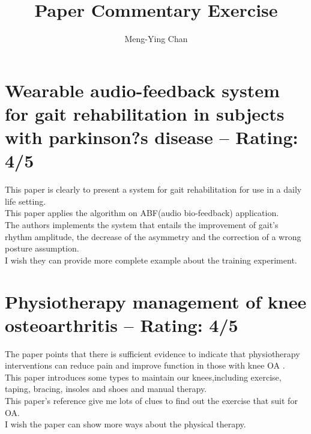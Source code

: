 \documentclass[a4paper]{article}
\title{Paper Commentary Exercise}
\author{Meng-Ying Chan}
\begin{document}
\maketitle

\section{Wearable audio-feedback system for gait rehabilitation in subjects with parkinson?s disease -- Rating: 4/5}

This paper \cite{Casamassima:2013:WAS:2494091.2494178} is clearly to present a system for gait rehabilitation for use in a daily life setting. \\

This paper applies the algorithm on ABF(audio bio-feedback) application.\\

The authors implements the system that entails the improvement of gait's rhythm amplitude, the decrease of the asymmetry and the correction of a wrong posture assumption.\\

I wish they can provide more complete example about the training experiment. 


\section{Physiotherapy management of knee osteoarthritis \cite{APL:APL1612} -- Rating: 4/5}


The paper points that there is sufficient evidence to indicate that physiotherapy interventions can reduce pain and improve function in those with knee OA .\\

This paper introduces some types to maintain our knees,including exercise, taping, bracing, insoles and shoes and manual therapy.\\ 

This paper's reference give me lots of clues to find out the exercise that suit for OA.\\

I wish the paper can show more ways about the physical therapy.





\end{document}
